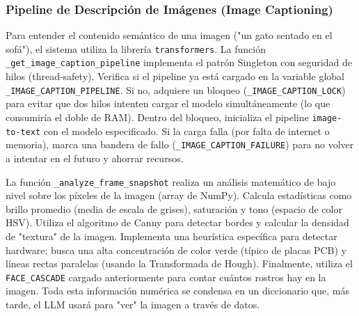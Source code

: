 \documentclass[letterpaper,12pt]{article}
\begin{document}
\subsubsection{Pipeline de Descripción de Imágenes (Image Captioning)}

Para entender el contenido semántico de una imagen ("un gato sentado en el sofá"), el sistema utiliza la librería \texttt{transformers}.
La función \texttt{\_get\_image\_caption\_pipeline} implementa el patrón Singleton con seguridad de hilos (thread-safety).
Verifica si el pipeline ya está cargado en la variable global \texttt{\_IMAGE\_CAPTION\_PIPELINE}.
Si no, adquiere un bloqueo (\texttt{\_IMAGE\_CAPTION\_LOCK}) para evitar que dos hilos intenten cargar el modelo simultáneamente (lo que consumiría el doble de RAM).
Dentro del bloqueo, inicializa el pipeline \texttt{image-to-text} con el modelo especificado. Si la carga falla (por falta de internet o memoria), marca una bandera de fallo (\texttt{\_IMAGE\_CAPTION\_FAILURE}) para no volver a intentar en el futuro y ahorrar recursos.

La función \texttt{\_analyze\_frame\_snapshot} realiza un análisis matemático de bajo nivel sobre los píxeles de la imagen (array de NumPy).
Calcula estadísticas como brillo promedio (media de escala de grises), saturación y tono (espacio de color HSV).
Utiliza el algoritmo de Canny para detectar bordes y calcular la densidad de "textura" de la imagen.
Implementa una heurística específica para detectar hardware: busca una alta concentración de color verde (típico de placas PCB) y líneas rectas paralelas (usando la Transformada de Hough).
Finalmente, utiliza el \texttt{FACE\_CASCADE} cargado anteriormente para contar cuántos rostros hay en la imagen.
Toda esta información numérica se condensa en un diccionario que, más tarde, el LLM usará para "ver" la imagen a través de datos.
\end{document}
